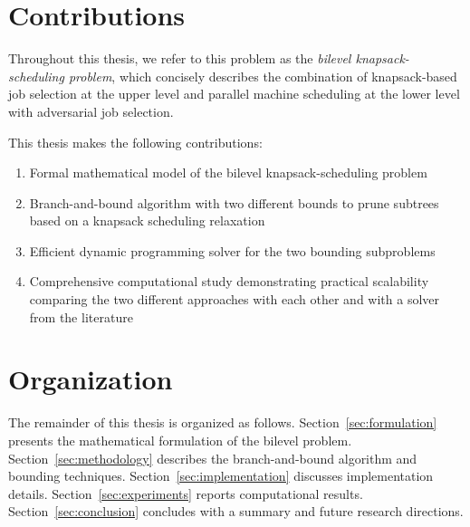 \section{Contributions}

Throughout this thesis, we refer to this problem as the \emph{bilevel knapsack-scheduling problem}, which concisely describes the combination of knapsack-based job selection at the upper level and parallel machine scheduling at the lower level with adversarial job selection.

This thesis makes the following contributions:
\begin{enumerate}
    \item Formal mathematical model of the bilevel knapsack-scheduling problem
    \item Branch-and-bound algorithm with two different bounds to prune subtrees based on a knapsack scheduling relaxation
    \item Efficient dynamic programming solver for the two bounding subproblems
    \item Comprehensive computational study demonstrating practical scalability comparing the two different approaches with each other and with a solver from the literature
\end{enumerate}

\section{Organization}

The remainder of this thesis is organized as follows. Section~\ref{sec:formulation} presents the mathematical formulation of the bilevel problem. Section~\ref{sec:methodology} describes the branch-and-bound algorithm and bounding techniques. Section~\ref{sec:implementation} discusses implementation details. Section~\ref{sec:experiments} reports computational results. Section~\ref{sec:conclusion} concludes with a summary and future research directions.
